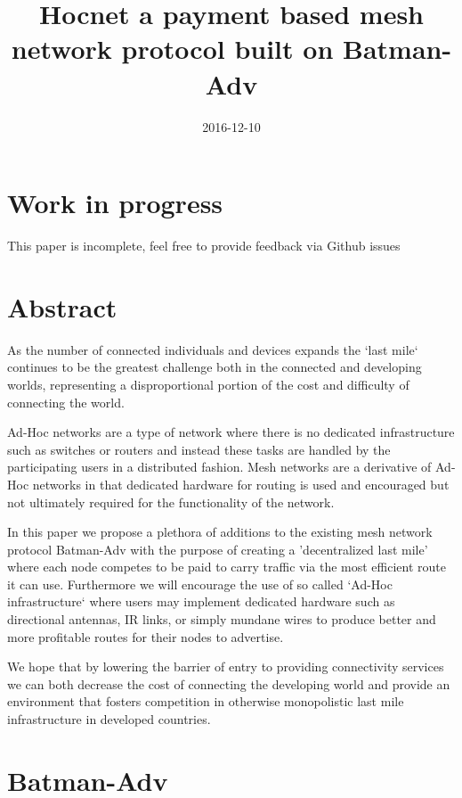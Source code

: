 \documentclass[11pt]{article}
\title{\textbf{Hocnet a payment based mesh network protocol built on Batman-Adv}}
\date{2016-12-10}
\begin{document}
\maketitle

\section{Work in progress}

This paper is incomplete, feel free to provide feedback via Github issues

\tableofcontents

\section{Abstract}

As the number of connected individuals and devices expands the `last mile` continues to be the greatest challenge both in the connected and developing worlds, representing a disproportional portion of the cost and difficulty of connecting the world.

Ad-Hoc networks are a type of network where there is no dedicated infrastructure such as switches or routers and instead these tasks are handled by the participating users in a distributed fashion. Mesh networks are a derivative of Ad-Hoc networks in that dedicated hardware for routing is used and encouraged but not ultimately required for the functionality of the network. 

In this paper we propose a plethora of additions to the existing mesh network protocol Batman-Adv with the purpose of creating a 'decentralized last mile' where each node competes to be paid to carry traffic via the most efficient route it can use. Furthermore we will encourage the use of so called `Ad-Hoc infrastructure` where users may implement dedicated hardware such as directional antennas, IR links, or simply mundane wires to produce better and more profitable routes for their nodes to advertise.

We hope that by lowering the barrier of entry to providing connectivity services we can both decrease the cost of connecting the developing world and provide an environment that fosters competition in otherwise monopolistic last mile infrastructure in developed countries.


\section{Batman-Adv}
\end{document}
